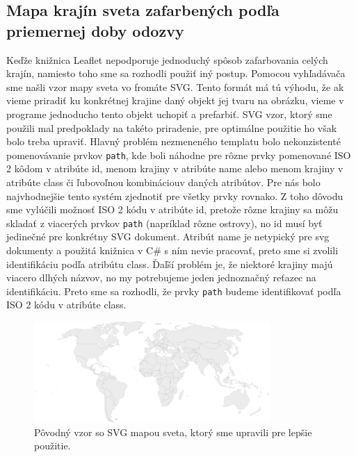 \subsection{Mapa krajín sveta zafarbených podľa priemernej doby odozvy}
Keďže knižnica Leaflet nepodporuje jednoduchý spôsob zafarbovania celých krajín, namiesto toho sme sa rozhodli použiť iný postup. Pomocou vyhľadávača sme
našli vzor mapy sveta vo fromáte SVG. Tento formát má tú výhodu, že ak vieme priradiť ku konkrétnej krajine daný objekt jej tvaru na obrázku, vieme v programe 
jednoducho tento objekt uchopiť a prefarbiť. SVG vzor, ktorý sme použili \cite{svg_mapa} mal predpoklady na takéto priradenie, pre optimálne použitie 
ho však bolo treba upraviť. Hlavný problém nezmeneného templatu bolo nekonzistenté pomenovávanie prvkov \lstinline{path}, kde boli náhodne pre rôzne prvky 
pomenované ISO 2 kôdom v atribúte id, menom krajiny v atribúte name alebo menom krajiny v atribúte class či ľubovoľnou kombináciouv daných atribútov. 
Pre nás bolo najvhodnejšie tento systém zjednotiť pre všetky prvky rovnako. Z toho dôvodu sme vylúčili možnosť ISO 2 kódu v atribúte id, pretože rôzne krajiny 
sa môžu skladať z viacerých prvkov \lstinline{path} (napríklad rôzne ostrovy), no id musí byť jedinečné pre konkrétny SVG dokument. Atribút name je netypický 
pre svg dokumenty a použitá knižnica v C\# s ním nevie pracovať, preto sme si zvolili identifikáciu podľa atribútu class. Ďaľší problém je, že niektoré krajiny 
majú viacero dlhých názvov, no my potrebujeme jeden jednoznačný reťazec na identifikáciu. Preto sme sa rozhodli, že prvky \lstinline{path} budeme identifikovať 
podľa ISO 2 kódu v atribúte class.
\begin{figure}
    \centerline{\includegraphics[width=0.8\textwidth]{images/world}}
    \caption[Neupravený svg vzor]{Pôvodný vzor so SVG mapou sveta, ktorý sme upravili pre lepšie použitie. }
    \label{obr:world}
\end{figure}